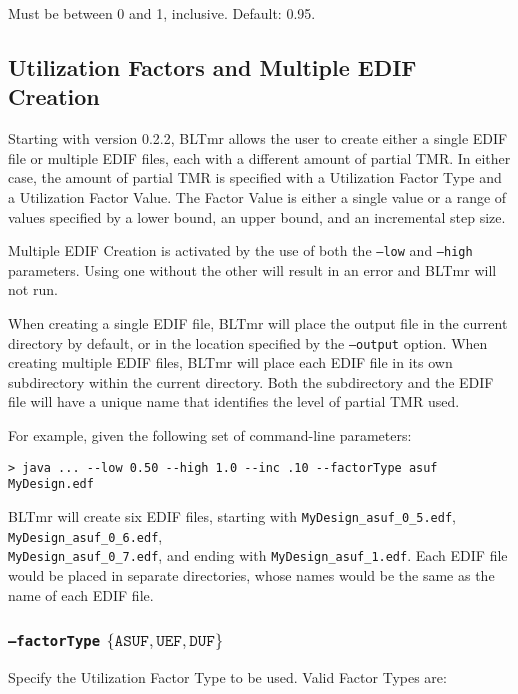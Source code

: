 \documentclass[english]{article}
\begin{document}
Must be between 0 and 1, inclusive. Default: 0.95.

\subsection{Utilization Factors and Multiple EDIF Creation}
Starting with version 0.2.2, BLTmr allows the user to create either a single 
EDIF file or multiple EDIF files, each with a different amount of partial TMR.
In either case, the amount of partial TMR is specified with a Utilization Factor
Type and a Utilization Factor Value.  The Factor Value is either a single value
or a range of values specified by a lower bound, an upper bound, and an 
incremental step size.

Multiple EDIF Creation is activated by the use of both the \texttt{--low} and
\texttt{--high} parameters.  Using one without the other will result in an error
and BLTmr will not run.

When creating a single EDIF file, BLTmr will place the output file in the
current directory by default, or in the location specified by the
\texttt{--output} option. When creating multiple EDIF files, BLTmr will place
each EDIF file in its own subdirectory within the current directory. Both the 
subdirectory and the EDIF file will have a unique name that identifies the level
of partial TMR used.  

For example, given the following set of command-line parameters: 

\begin{verbatim}
> java ... --low 0.50 --high 1.0 --inc .10 --factorType asuf MyDesign.edf
\end{verbatim} 
BLTmr will create six EDIF files, starting with 
\texttt{MyDesign\_asuf\_0\_5.edf}, \texttt{MyDesign\_asuf\_0\_6.edf}, 
\\\texttt{MyDesign\_asuf\_0\_7.edf}, and ending with 
\texttt{MyDesign\_asuf\_1.edf}. Each EDIF file would be placed in separate 
directories, whose names would be the same as the name of each EDIF file.

\subsubsection{\texttt{--factorType} $\{ \mathtt{ASUF},\mathtt{UEF},\mathtt{DUF} \}$ }
Specify the Utilization Factor Type to be used. Valid Factor Types are:
\end{document}
